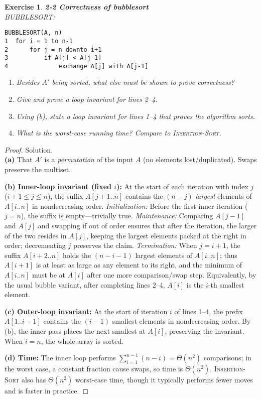 \documentclass[12pt]{article}
\newtheorem{exercise}[theorem]{Exercise}
\theoremstyle{definition}
\begin{document}
\newpage

\begin{exercise}
\noindent
\textbf{2-2 Correctness of bubblesort}\\
\noindent
\textsc{BUBBLESORT}:
\begin{verbatim}
BUBBLESORT(A, n)
1  for i = 1 to n-1
2      for j = n downto i+1
3          if A[j] < A[j-1]
4              exchange A[j] with A[j-1]
\end{verbatim}
\begin{enumerate}\itemsep0.25em
\item[(a)] Besides $A'$ being sorted, what else must be shown to prove correctness?
\item[(b)] Give and prove a loop invariant for lines 2–4.
\item[(c)] Using (b), state a loop invariant for lines 1–4 that proves the algorithm sorts.
\item[(d)] What is the worst-case running time? Compare to \textsc{Insertion-Sort}.
\end{enumerate}
\end{exercise}

\vspace{1pt}

\begin{proof}
Solution.\\

\noindent
\textbf{(a)} That $A'$ is a \emph{permutation} of the input $A$ (no elements lost/duplicated). Swaps preserve the multiset.

\smallskip
\noindent
\textbf{(b) Inner-loop invariant (fixed $i$):}
At the start of each iteration with index $j$ ($i+1\le j\le n$), the suffix $A[j+1..n]$
contains the $(n-j)$ \emph{largest} elements of $A[i..n]$ in nondecreasing order.
\emph{Initialization:} Before the first inner iteration ($j=n$), the suffix is empty—trivially true.
\emph{Maintenance:} Comparing $A[j-1]$ and $A[j]$ and swapping if out of order
ensures that after the iteration, the larger of the two resides in $A[j]$, keeping the
largest elements packed at the right in order; decrementing $j$ preserves the claim.
\emph{Termination:} When $j=i+1$, the suffix $A[i+2..n]$ holds the $(n-i-1)$ largest
elements of $A[i..n]$; thus $A[i+1]$ is at least as large as any element to its right,
and the minimum of $A[i..n]$ must be at $A[i]$ after one more comparison/swap step.
Equivalently, by the usual bubble variant, after completing lines 2–4, $A[i]$ is the
$i$-th smallest element.

\smallskip
\noindent
\textbf{(c) Outer-loop invariant:}
At the start of iteration $i$ of lines 1–4, the prefix $A[1..i-1]$ contains the $(i-1)$
smallest elements in nondecreasing order. By (b), the inner pass places the next
smallest at $A[i]$, preserving the invariant. When $i=n$, the whole array is sorted.

\smallskip
\noindent
\textbf{(d) Time:} The inner loop performs $\sum_{i=1}^{n-1}(n-i)=\Theta(n^2)$ comparisons;
in the worst case, a constant fraction cause swaps, so time is $\Theta(n^2)$. \textsc{Insertion-Sort}
also has $\Theta(n^2)$ worst-case time, though it typically performs fewer moves and is faster in practice.
\end{proof}
\end{document}

